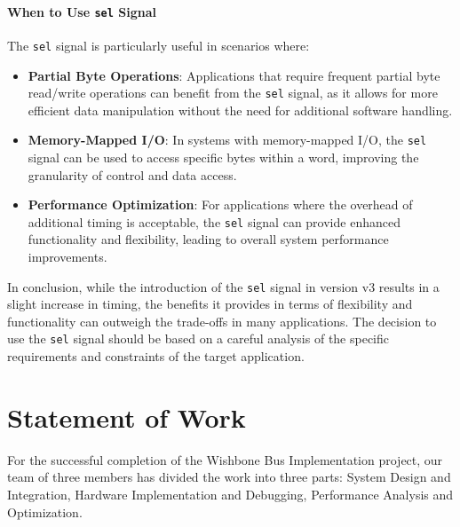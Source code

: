 \documentclass[conference]{IEEEtran}
\begin{document}
\paragraph{When to Use \texttt{sel} Signal}
The \texttt{sel} signal is particularly useful in scenarios where:
\begin{itemize}
    \item \textbf{Partial Byte Operations}: Applications that require frequent partial byte read/write operations can benefit from the \texttt{sel} signal, as it allows for more efficient data manipulation without the need for additional software handling.
    \item \textbf{Memory-Mapped I/O}: In systems with memory-mapped I/O, the \texttt{sel} signal can be used to access specific bytes within a word, improving the granularity of control and data access.
    \item \textbf{Performance Optimization}: For applications where the overhead of additional timing is acceptable, the \texttt{sel} signal can provide enhanced functionality and flexibility, leading to overall system performance improvements.
\end{itemize}

In conclusion, while the introduction of the \texttt{sel} signal in version v3 results in a slight increase in timing, the benefits it provides in terms of flexibility and functionality can outweigh the trade-offs in many applications. The decision to use the \texttt{sel} signal should be based on a careful analysis of the specific requirements and constraints of the target application.






\section{Statement of Work}
For the successful completion of the Wishbone Bus Implementation project, our team of three members has divided the work into three parts: System Design and Integration, Hardware Implementation and Debugging, Performance Analysis and Optimization.
\end{document}
